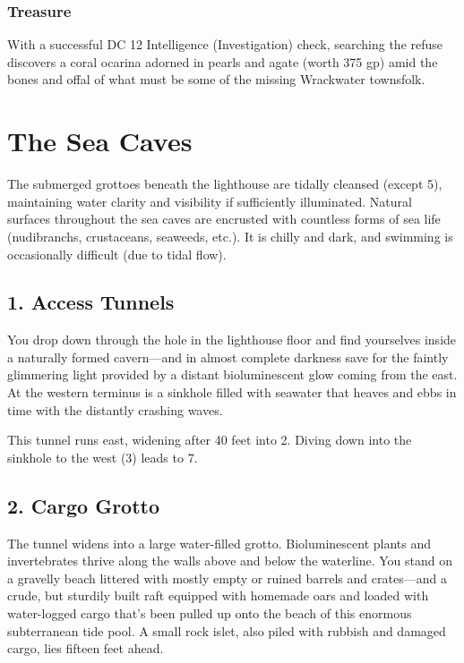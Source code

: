 \documentclass[10pt,a4paper,twoside,bg=print,twocolumn,openany,nodeprecatedcode]{dndbook}
\begin{document}
\subsubsection{Treasure}
With a successful DC 12 Intelligence (Investigation) check, searching the refuse discovers a coral ocarina adorned in pearls and agate (worth 375 gp) amid the bones and offal of what must be some of the missing Wrackwater townsfolk.

\section{The Sea Caves}
The submerged grottoes beneath the lighthouse are tidally cleansed (except 5), maintaining water clarity and visibility if sufficiently illuminated. Natural surfaces throughout the sea caves are encrusted with countless forms of sea life (nudibranchs, crustaceans, seaweeds, etc.). It is chilly and dark, and swimming is occasionally difficult (due to tidal flow).

\subsection{1. Access Tunnels}
\begin{DndReadAloud}{}
You drop down through the hole in the lighthouse floor and find yourselves inside a naturally formed cavern—and in almost complete darkness save for the faintly glimmering light provided by a distant bioluminescent glow coming from the east. At the western terminus is a sinkhole filled with seawater that heaves and ebbs in time with the distantly crashing waves.

\end{DndReadAloud}

This tunnel runs east, widening after 40 feet into 2. Diving down into the sinkhole to the west (3) leads to 7.

\subsection{2. Cargo Grotto}
\begin{DndReadAloud}{}
The tunnel widens into a large water-filled grotto. Bioluminescent plants and invertebrates thrive along the walls above and below the waterline. You stand on a gravelly beach littered with mostly empty or ruined barrels and crates—and a crude, but sturdily built raft equipped with homemade oars and loaded with water-logged cargo that's been pulled up onto the beach of this enormous subterranean tide pool. A small rock islet, also piled with rubbish and damaged cargo, lies fifteen feet ahead.

\end{DndReadAloud}
\end{document}

